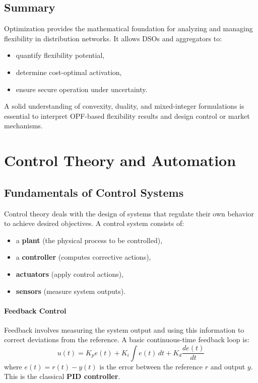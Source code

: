 \documentclass[11pt]{article}
\begin{document}
	\subsection*{Summary}
	
	Optimization provides the mathematical foundation for analyzing and managing flexibility in distribution networks.  
	It allows DSOs and aggregators to:
	\begin{itemize}
		\item quantify flexibility potential,
		\item determine cost-optimal activation,
		\item ensure secure operation under uncertainty.
	\end{itemize}
	
	A solid understanding of convexity, duality, and mixed-integer formulations is essential to interpret OPF-based flexibility results and design control or market mechanisms.
	
	
	\section{Control Theory and Automation}
	
	\subsection{Fundamentals of Control Systems}
	
	Control theory deals with the design of systems that regulate their own behavior to achieve desired objectives.  
	A control system consists of:
	\begin{itemize}
		\item a \textbf{plant} (the physical process to be controlled),
		\item a \textbf{controller} (computes corrective actions),
		\item \textbf{actuators} (apply control actions),
		\item \textbf{sensors} (measure system outputs).
	\end{itemize}
	
	\paragraph{Feedback Control}
	Feedback involves measuring the system output and using this information to correct deviations from the reference.  
	A basic continuous-time feedback loop is:
	\[
	u(t) = K_p e(t) + K_i \int e(t)\, dt + K_d \frac{de(t)}{dt}
	\]
	where $e(t) = r(t) - y(t)$ is the error between the reference $r$ and output $y$.  
	This is the classical \textbf{PID controller}.
	
\end{document}
